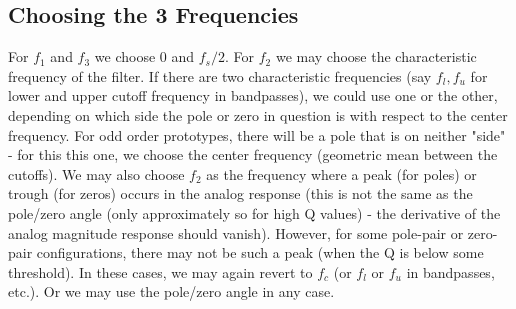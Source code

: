 \subsection{Choosing the 3 Frequencies}
For $f_1$ and $f_3$ we choose $0$ and $f_s/2$. For $f_2$ we may choose the characteristic frequency of the filter. If there are two characteristic frequencies (say $f_l, f_u$ for lower and upper cutoff frequency in bandpasses), we could use one or the other, depending on which side the pole or zero in question is with respect to the center frequency. For odd order prototypes, there will be a pole that is on neither "side" - for this this one, we choose the center frequency (geometric mean between the cutoffs). We may also choose $f_2$ as the frequency where a peak (for poles) or trough (for zeros) occurs in the analog response (this is not the same as the pole/zero angle (only approximately so for high Q values) - the derivative of the analog magnitude response should vanish). However, for some pole-pair or zero-pair configurations, there may not be such a peak (when the Q is below some threshold). In these cases, we may again revert to $f_c$ (or $f_l$ or $f_u$ in bandpasses, etc.). Or we may use the pole/zero angle in any case.

